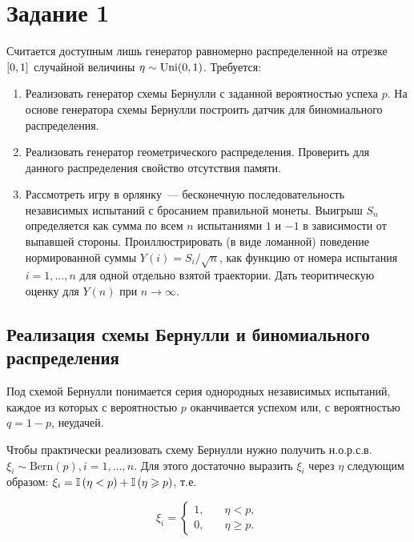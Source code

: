 \section{Задание 1}
    Считается доступным лишь генератор равномерно распределенной на 
    отрезке \(\left[0,1\right]\) случайной величины
    $\eta \sim \mathrm{Uni}(0,1)$. Требуется:

    \begin{enumerate}
        \item Реализовать генератор схемы Бернулли с заданной вероятностью
        успеха $p$. На основе генератора схемы Бернулли построить датчик для
        биномиального распределения.
        \item Реализовать генератор геометрического распределения. Проверить 
        для данного распределения свойство отсутствия памяти.
        \item Рассмотреть игру в орлянку~--- бесконечную последовательность 
        независимых испытаний с бросанием правильной монеты. Выигрыш $S_n$ 
        определяется как сумма по всем $n$ испытаниями $1$ и $-1$ в зависимости 
        от выпавшей стороны. Проиллюстрировать (в виде ломанной) поведение 
        нормированной суммы $Y(i) = S_i/\sqrt{n}$, как функцию от номера 
        испытания $i = 1,\dots, n$ для одной отдельно взятой траектории. Дать 
        теоритическую оценку для $Y(n)$  при $n \rightarrow \infty$.
    \end{enumerate}

    \subsection{Реализация схемы Бернулли и биномиального распределения}
        Под схемой Бернулли понимается серия однородных независимых испытаний, 
        каждое из которых с вероятностью $p$ оканчивается успехом или, с 
        вероятностью $q = 1-p$, неудачей.

        Чтобы практически реализовать схему Бернулли нужно получить н.о.р.с.в.\\ 
        $\xi_i \sim \mathrm{Bern}(p), i = 1,\dots,n$. Для этого достаточно 
        выразить $\xi_i$ через $\eta$ следующим образом: $\xi_i = 
        \mathbb{I}\left(\eta < p\right) + \mathbb{I}\left(\eta \geqslant p\right)$, т.е.

        \[\xi_i = \left\{\begin{aligned}
                            1,&\quad \eta < p,\\
                            0,&\quad \eta \ge p.
        \end{aligned}\right.\]
    
